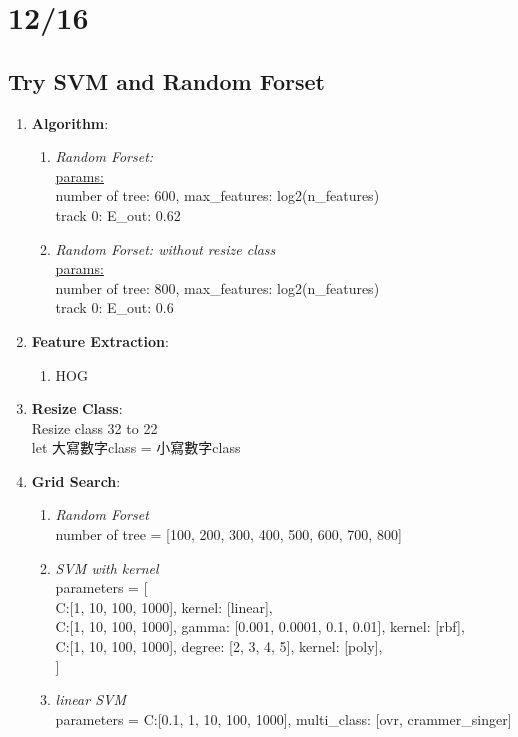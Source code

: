 \documentclass[12pt]{article}
\theoremstyle{definition}
\theoremstyle{remark}
\begin{document}
\section{12/16}
\subsection{Try SVM and Random Forset}
\begin{enumerate}
  \item \textbf{Algorithm}:
      \begin{enumerate}
          \item {\em Random Forset:\/} \\
            \underline{params:} \\
            number of tree: 600, max\_features: log2(n\_features)\\
            {\color{red}track 0: E\_out: 0.62}
          \item {\em Random Forset:\/ without resize class} \\
            \underline{params:} \\
            number of tree: 800, max\_features: log2(n\_features)\\
            {\color{red}track 0: E\_out: 0.6}
      \end{enumerate}
    \item \textbf{Feature Extraction}:
      \begin{enumerate}
        \item HOG
      \end{enumerate}
    \item \textbf{Resize Class}:\\
      Resize class 32 to 22\\
      let 大寫數字class =  小寫數字class
    \item \textbf{Grid Search}:
      \begin{enumerate}
        \item {\em Random Forset\/} \\
          number of tree = [100, 200, 300, 400, 500, 600, 700, 800]
        \item {\em SVM with kernel\/}\\
        parameters = [ \\
          {C:[1, 10, 100, 1000], kernel: [linear]},\\
          {C:[1, 10, 100, 1000], gamma: [0.001, 0.0001, 0.1, 0.01], kernel: [rbf]},\\
          {C:[1, 10, 100, 1000], degree: [2, 3, 4, 5], kernel: [poly]}, \\
        ]
        \item {\em linear SVM\/}\\
        parameters = {C:[0.1, 1, 10, 100, 1000], multi\_class: [ovr, crammer\_singer]}
      \end{enumerate}
\end{enumerate}
\end{document}
